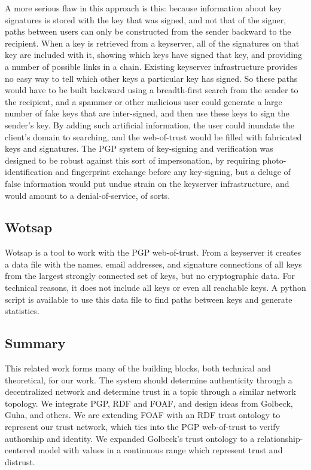 \documentclass{acm_proc_article-sp}
\begin{document}
A more serious flaw in this approach is this:  because information about key signatures is stored with the key that was signed, and not that of the signer, paths between users can only be constructed from the sender backward to the recipient. When a key is retrieved from a keyserver, all of the signatures on that key are included with it, showing which keys have signed that key, and providing a number of possible links in a chain.  Existing keyserver infrastructure provides no easy way to tell which other keys a particular key has signed.  So these paths would have to be built backward using a breadth-first search from the sender to the recipient, and a spammer or other malicious user could generate a large number of fake keys that are inter-signed, and then use these keys to sign the sender's key. By adding such artificial information, the user could inundate the client's domain to searching, and the web-of-trust would be filled with fabricated keys and signatures. The PGP system of key-signing and verification was designed to be robust against this sort of impersonation, by requiring photo-identification and fingerprint exchange before any key-signing, but a deluge of false information would put undue strain on the keyserver infrastructure, and would amount to a denial-of-service, of sorts.

\subsection{Wotsap}
\label{wotsap}
Wotsap \citep{wotsap} is a tool to work with the PGP web-of-trust.  From a keyserver it creates a data file with the names, email addresses, and signature connections of all keys from the largest strongly connected set of keys, but no cryptographic data.  For technical reasons, it does not include all keys or even all reachable keys.  A python script is available to use this data file to find paths between keys and generate statistics.

\subsection{Summary}
This related work forms many of the building blocks, both technical and theoretical, for our work.  The system should determine authenticity through a decentralized network and determine trust in a topic through a similar network topology.  We integrate PGP, RDF and FOAF, and design ideas from Golbeck, Guha, and others.  We are extending FOAF with an RDF trust ontology to represent our trust network, which ties into the PGP web-of-trust to verify authorship and identity.  We expanded Golbeck's trust ontology to a relationship-centered model with values in a continuous range which represent trust and distrust.
\end{document}
